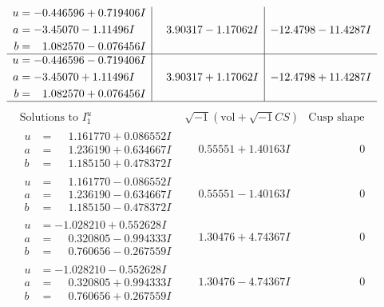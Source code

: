 \documentclass[1p]{elsarticle_modified}
\theoremstyle{definition}
\newcommand{\I}{\sqrt{-1}}
\begin{document}
$$\begin{array}{c|c|c}
\begin{aligned}
u &= -0.446596 + 0.719406 I \\
a &= -3.45070 - 1.11496 I \\
b &= \phantom{-}1.082570 - 0.076456 I\end{aligned}
 & \phantom{-}3.90317 - 1.17062 I & -12.4798 - 11.4287 I \\ \hline\begin{aligned}
u &= -0.446596 - 0.719406 I \\
a &= -3.45070 + 1.11496 I \\
b &= \phantom{-}1.082570 + 0.076456 I\end{aligned}
 & \phantom{-}3.90317 + 1.17062 I & -12.4798 + 11.4287 I\\
 \hline 
 \end{array}$$\newpage$$\begin{array}{c|c|c}  
\text{Solutions to }I^u_{1}& \I (\text{vol} + \sqrt{-1}CS) & \text{Cusp shape}\\
 \hline 
\begin{aligned}
u &= \phantom{-}1.161770 + 0.086552 I \\
a &= \phantom{-}1.236190 + 0.634667 I \\
b &= \phantom{-}1.185150 + 0.478372 I\end{aligned}
 & \phantom{-}0.55551 + 1.40163 I & \phantom{-0.000000 } 0 \\ \hline\begin{aligned}
u &= \phantom{-}1.161770 - 0.086552 I \\
a &= \phantom{-}1.236190 - 0.634667 I \\
b &= \phantom{-}1.185150 - 0.478372 I\end{aligned}
 & \phantom{-}0.55551 - 1.40163 I & \phantom{-0.000000 } 0 \\ \hline\begin{aligned}
u &= -1.028210 + 0.552628 I \\
a &= \phantom{-}0.320805 - 0.994333 I \\
b &= \phantom{-}0.760656 - 0.267559 I\end{aligned}
 & \phantom{-}1.30476 + 4.74367 I & \phantom{-0.000000 } 0 \\ \hline\begin{aligned}
u &= -1.028210 - 0.552628 I \\
a &= \phantom{-}0.320805 + 0.994333 I \\
b &= \phantom{-}0.760656 + 0.267559 I\end{aligned}
 & \phantom{-}1.30476 - 4.74367 I & \phantom{-0.000000 } 0 \\ \hline\begin{aligned}

\end{aligned}
\end{array}$$
\end{document}
